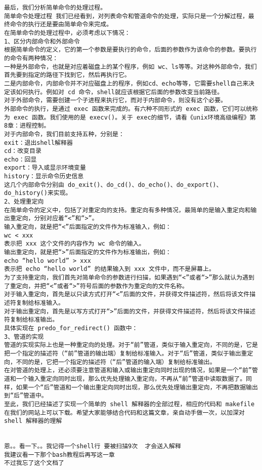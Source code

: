 \begin{lstlisting}
最后，我们分析简单命令的处理过程。 
简单命令处理过程 我们已经看到，对列表命令和管道命令的处理，实际只是一个分解过程，最终命令的执行还是要由简单命令来完成。 
在简单命令的处理过程中，必须考虑以下情况： 
1、区分内部命令和外部命令 
根据简单命令的定义，它的第一个参数是要执行的命令，后面的参数作为该命令的参数。要执行的命令有两种情况： 
一种是外部命令，也就是对应着磁盘上的某个程序，例如 wc、ls等等。对这种外部命令，我们首先要到指定的路径下找到它，然后再执行它。 
二是内部命令，内部命令并不对应磁盘上的程序，例如cd、echo等等，它需要shell自己来决定该如何执行。例如对 cd 命令，shell就应该根据它后面的参数改变当前路径。 
对于外部命令，需要创建一个子进程来执行它，而对于内部命令，则没有这个必要。 
外部命令的执行，是通过 exec 函数来完成的。有六种不同形式的 exec 函数，它们可以统称为 exec 函数。我们使用的是 execv()。关于 exec的细节，请看《unix环境高级编程》第8章：进程控制。 
对于内部命令，我们目前支持五种，分别是： 
exit：退出shell解释器 
cd：改变目录 
echo：回显 
export：导入或显示环境变量 
history：显示命令历史信息 
这几个内部命令分别由 do_exit()、do_cd()、do_echo()、do_export()、do_history()来实现。 
2、处理重定向 
在简单命令的定义中，包括了对重定向的支持。重定向有多种情况，最简单的是输入重定向和输出重定向，分别对应着“<”和“>”。 
输入重定向，就是把“<”后面指定的文件作为标准输入，例如： 
wc < xxx 
表示把 xxx 这个文件的内容作为 wc 命令的输入。 
输出重定向，就是把“>”后面指定的文件作为标准输出，例如： 
echo “hello world” > xxx 
表示把 echo “hello world” 的结果输入到 xxx 文件中，而不是屏幕上。 
为了支持重定向，我们首先对简单命令的参数进行扫描，如果遇到“<”或者“>”那么就认为遇到了重定向，并把“<”或者“>”符号后面的参数作为重定向的文件名称。 
对于输入重定向，首先是以只读方式打开“<”后面的文件，并获得文件描述符，然后将该文件描述符复制给标准输入。 
对于输出重定向，首先是以写方式打开“>”后面的文件，并获得文件描述符，然后将该文件描述符复制给标准输出。 
具体实现在 predo_for_redirect() 函数中： 
3、管道的实现 
管道的实现实际上也是一种重定向的处理。对于“前”管道，类似于输入重定向，不同的是，它是把一个指定的描述符（“前”管道的输出端）复制给标准输入。对于“后”管道，类似于输出重定向，不同的是，它把一个指定的描述符（“后”管道的输入端）复制给标准输出。 
在对管道的处理上，还必须要注意管道和输入或输出重定向同时出现的情况，如果是一个“前”管道和一个输入重定向同时出现，那么优先处理输入重定向，不再从“前”管道中读取数据了。同样，如果一个“后”管道和一个输出重定向同时出现，那么优先处理输出重定向，不再把数据输出到“后”管道中。 
至此，我们已经描述了实现一个简单的 shell 解释器的全部过程，相应的代码和 makefile 在我们的网站上可以下载。希望大家能够结合代码和这篇文章，亲自动手做一次，以加深对shell 解释器的理解 


恩。。看一下。。我记得一个shell行 要被扫描9次  才会送入解释
我建议看一下那个bash教程后再写这一章
不过我忘了这个文档了
\end{lstlisting}


